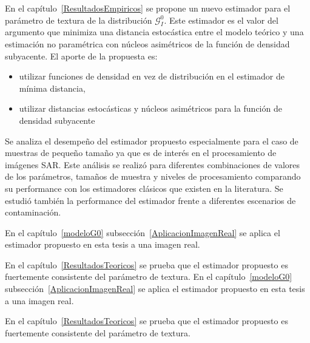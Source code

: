 En el capítulo~\ref{ResultadosEmpiricos} se propone un nuevo estimador para el parámetro de textura de la distribución $\mathcal{G}_I^0$. Este estimador es el valor del argumento que minimiza una distancia estocástica entre el modelo teórico y una estimación no paramétrica con núcleos asimétricos de la función de densidad subyacente. 
El aporte de la propuesta es:
\begin{itemize}
	\item utilizar funciones de densidad en vez de distribución en el estimador de mínima distancia,
	\item utilizar distancias estocásticas y núcleos asimétricos para la función de densidad subyacente
\end{itemize} 

 Se analiza el desempeño del estimador propuesto especialmente para el caso de muestras de pequeño tamaño ya que es de interés en el procesamiento de imágenes SAR. Este análisis se realizó para diferentes combinaciones de valores de los parámetros, tamaños de muestra y niveles de procesamiento comparando su performance con los estimadores clásicos que existen en la literatura. Se estudió también la performance del estimador frente a diferentes escenarios de contaminación.

En el capítulo~\ref{modeloG0} subsección~\ref{AplicacionImagenReal} se aplica el estimador propuesto en esta tesis a una imagen real.

En el capítulo~\ref{ResultadosTeoricos} se prueba que el estimador propuesto es fuertemente consistente del parámetro de textura.
En el capítulo~\ref{modeloG0} subsección~\ref{AplicacionImagenReal} se aplica el estimador propuesto en esta tesis a una imagen real.

En el capítulo~\ref{ResultadosTeoricos} se prueba que el estimador propuesto es fuertemente consistente del parámetro de textura.
	